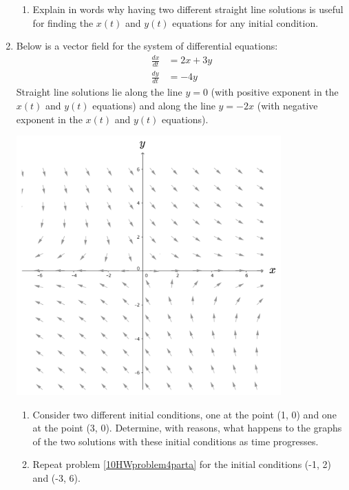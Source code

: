 \begin{enumerate}
\begin{enumerate}
\item	Explain in words why having two different straight line solutions is useful for finding the $x(t)$ and $y(t)$ equations for any initial condition. \label{10HWproblem3partc}
\end{enumerate}

\clearpage

\item	Below is a vector field for the system of differential equations:
\begin{align*}
\frac{dx}{dt}&=2x+3y\\
\frac{dy}{dt}&=-4y
\end{align*}
Straight line solutions lie along the line $y = 0$ (with positive exponent in the $x(t)$ and $y(t)$ equations) and along the line $y = -2x$ (with negative exponent in the $x(t)$ and $y(t)$ equations).
\begin{center}
\includegraphics[width=4in]{10/10HWVectorField.png}
\end{center}
\begin{enumerate}
\item	Consider two different initial conditions, one at the point (1, 0) and one at the point (3, 0). Determine, with reasons, what happens to the graphs of the two solutions with these initial conditions as time progresses.\label{10HWproblem4parta} 
\item	Repeat problem \ref{10HWproblem4parta} for the initial conditions (-1, 2) and (-3, 6).\label{10HWproblem4partb}
\vfill

\end{enumerate}


\end{enumerate}
